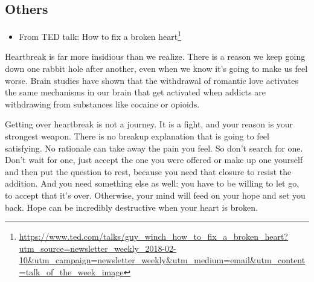 \documentclass[12pt,]{krantz}
\providecommand{\tightlist}{%
  \setlength{\itemsep}{0pt}\setlength{\parskip}{0pt}}
\renewcommand{\href}[2]{#2\footnote{\url{#1}}}
\begin{document}
\subsection{Others}\label{others}

\begin{itemize}
\tightlist
\item
  From TED talk:
  \href{https://www.ted.com/talks/guy_winch_how_to_fix_a_broken_heart?utm_source=newsletter_weekly_2018-02-10\&utm_campaign=newsletter_weekly\&utm_medium=email\&utm_content=talk_of_the_week_image}{How
  to fix a broken heart}
\end{itemize}

Heartbreak is far more insidious than we realize. There is a reason we
keep going down one rabbit hole after another, even when we know it's
going to make us feel worse. Brain studies have shown that the
withdrawal of romantic love activates the same mechanisms in our brain
that get activated when addicts are withdrawing from substances like
cocaine or opioids.

Getting over heartbreak is not a journey. It is a fight, and your reason
is your strongest weapon. There is no breakup explanation that is going
to feel satisfying. No rationale can take away the pain you feel. So
don't search for one. Don't wait for one, just accept the one you were
offered or make up one yourself and then put the question to rest,
because you need that closure to resist the addition. And you need
something else as well: you have to be willing to let go, to accept that
it's over. Otherwise, your mind will feed on your hope and set you back.
Hope can be incredibly destructive when your heart is broken.



\backmatter
\printindex
\end{document}
